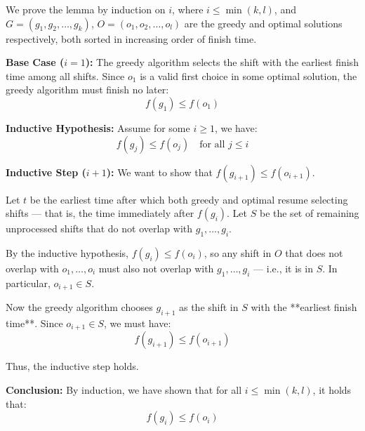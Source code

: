 \begin{soln}
	We prove the lemma by induction on \( i \), where \( i \leq \min(k, l) \), and \( G = (g_1, g_2, \dots, g_k) \), \( O = (o_1, o_2, \dots, o_l) \) are the greedy and optimal solutions respectively, both sorted in increasing order of finish time.

	\textbf{Base Case (\(i = 1\)):}
	The greedy algorithm selects the shift with the earliest finish time among all shifts. Since \( o_1 \) is a valid first choice in some optimal solution, the greedy algorithm must finish no later:
	\[
		f(g_1) \leq f(o_1)
	\]

	\textbf{Inductive Hypothesis:}
	Assume for some \( i \geq 1 \), we have:
	\[
		f(g_j) \leq f(o_j) \quad \text{for all } j \leq i
	\]

	\textbf{Inductive Step (\(i + 1\)):}
	We want to show that \( f(g_{i+1}) \leq f(o_{i+1}) \).

	Let \( t \) be the earliest time after which both greedy and optimal resume selecting shifts — that is, the time immediately after \( f(g_i) \). Let \( S \) be the set of remaining unprocessed shifts that do not overlap with \( g_1, \dots, g_i \).

	By the inductive hypothesis, \( f(g_i) \leq f(o_i) \), so any shift in \( O \) that does not overlap with \( o_1, \dots, o_i \) must also not overlap with \( g_1, \dots, g_i \) — i.e., it is in \( S \). In particular, \( o_{i+1} \in S \).

	Now the greedy algorithm chooses \( g_{i+1} \) as the shift in \( S \) with the **earliest finish time**. Since \( o_{i+1} \in S \), we must have:
	\[
		f(g_{i+1}) \leq f(o_{i+1})
	\]

	Thus, the inductive step holds.

	\textbf{Conclusion:}
	By induction, we have shown that for all \( i \leq \min(k, l) \), it holds that:
	\[
		f(g_i) \leq f(o_i)
	\]

\end{soln}
